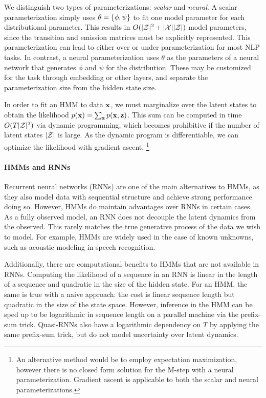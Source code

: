 \documentclass[11pt,a4paper]{article}
\begin{document}
We distinguish two types of parameterizations: \textit{scalar} and \textit{neural}.
A scalar parameterization simply uses $\theta = \left\{\phi,\psi\right\}$ to fit one model parameter for
each distributional parameter.
This results in $O(|\mathcal{Z}|^2 + |\mathcal{X}||\mathcal{Z}|)$ model parameters,
since the transition and emission matrices must be explicitly represented.
This parameterization can lead to either over or under parameterization for most NLP tasks.
In contrast, a neural parameterization uses $\theta$ as the parameters of a neural network
that generates $\phi$ and $\psi$ for the distribution.
These may be customized for the task through embedding or other layers,
and separate the parameterization size from the hidden state size. 

In order to fit an HMM to data $\mathbf{x}$,
we must marginalize over the latent states to obtain the likelihood
$p(\mathbf{x}) = \sum_{\mathbf{z}}p(\mathbf{x},\mathbf{z})$.
This sum can be computed in time $O(T|\mathcal{Z}|^2)$ via dynamic programming,
which becomes prohibitive if the number of latent states $|\mathcal{Z}|$ is large.
As the dynamic program is differentiable, we can optimize the likelihood 
with gradient ascent.
\footnote{An alternative method would be to employ expectation maximization,
however there is no closed form solution for the M-step with a neural parameterization.
Gradient ascent is applicable to both the scalar and neural parameterizations.}

\paragraph{HMMs and RNNs}
Recurrent neural networks (RNNs) are one of the main alternatives to HMMs,
as they also model data with sequential structure and achieve strong 
performance doing so.
However, HMMs do maintain advantages over RNNs in certain cases.
As a fully observed model, an RNN does not decouple the latent dynamics from the observed.
This rarely matches the true generative process of the data we wish to model.
For example, HMMs are widely used in the case of known unknowns,
such as acoustic modeling in speech recognition.

Additionally, there are computational benefits to HMMs that are not available in RNNs.
Computing the likelihood of a sequence in an RNN is linear in the length of a sequence
and quadratic in the size of the hidden state.
For an HMM, the same is true with a naive approach: the cost is linear sequence length
but quadratic in the size of the state space.
However, inference in the HMM can be sped up to be logarithmic in sequence length
on a parallel machine via the prefix-sum trick.
Quasi-RNNs \citep{bradbury2016qrnn} also have a logarithmic dependency on $T$
by applying the same prefix-sum trick, but do not model uncertainty over
latent dynamics.
\end{document}
